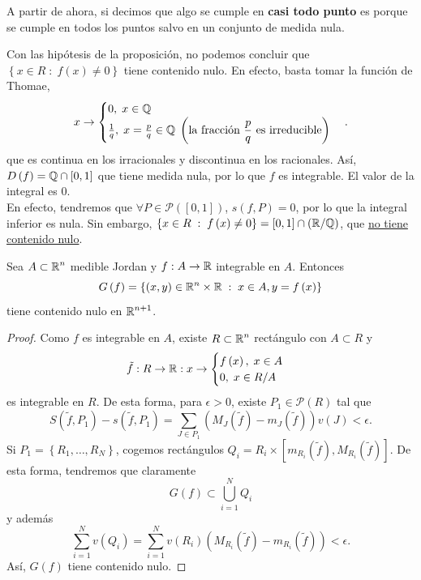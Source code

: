 \begin{notation}
A partir de ahora, si decimos que algo se cumple en \textbf{casi todo punto} es porque se cumple en todos los puntos salvo en un conjunto de medida nula.
\end{notation}
\begin{observation}
	Con las hipótesis de la proposición, no podemos concluir que $\displaystyle \left\{ x \in R \; : \; f\left(x\right) \neq 0\right\}  $ tiene contenido nulo. En efecto, basta tomar la función de Thomae,
	\[x \to 
	\begin{cases}
	0, \; x \in \mathbb{Q} \\
	\frac{1}{q}, \; x=\frac{p}{q} \in \mathbb{Q} \; \left(\text{la fracción $\displaystyle \frac{p}{q} $ es irreducible}\right)
	\end{cases}
	.\]
	que es continua en los irracionales y discontinua en los racionales. Así, $\displaystyle D\left(f\right) = \mathbb{Q} \cap \left[0,1\right]  $ que tiene medida nula, por lo que $\displaystyle f $ es integrable. El valor de la integral es 0. \\

	En efecto, tendremos que $\displaystyle \forall P \in \mathcal{P}\left(\left[0,1\right] \right) $, $\displaystyle s\left(f,P\right)= 0 $, por lo que la integral inferior es nula. 
	Sin embargo, $\displaystyle \left\{ x \in R \; : \; f\left(x\right)\neq 0\right\} = \left[0,1\right] \cap \left(\mathbb{R}/ \mathbb{Q}\right) $, que \underline{no tiene contenido nulo}.
\end{observation}
\begin{prop}
Sea $\displaystyle A \subset \mathbb{R}^{n} $ medible Jordan y $\displaystyle f :A \to \mathbb{R} $ integrable en $\displaystyle A $. Entonces
\[G\left(f\right)= \left\{ \left(x,y\right)\in \mathbb{R}^{n} \times \mathbb{R} \; : \; x \in A, y = f\left(x\right)\right\}  \]
tiene contenido nulo en $\displaystyle \mathbb{R}^{n+1} $. 
\end{prop}
\begin{proof}
Como $\displaystyle f $ es integrable en $\displaystyle A $, existe $\displaystyle R \subset \mathbb{R}^{n} $ rectángulo con $\displaystyle A \subset R $ y
\[\tilde{f} : R \to \mathbb{R} : x \to 
\begin{cases}
f\left(x\right), \; x \in A \\
0, \; x \in R/A
\end{cases}
\]
es integrable en $\displaystyle R $. De esta forma, para $\displaystyle \epsilon > 0 $, existe $\displaystyle P_{1} \in \mathcal{P}\left(R\right) $ tal que 
\[S\left(\tilde{f}, P_{1}\right)-s\left(\tilde{f},P_{1}\right)=\sum^{}_{J \in P_{1}}\left(M_{J}\left(\tilde{f}\right)-m_{J}\left(\tilde{f}\right)\right)v\left(J\right) < \epsilon  .\]
Si $\displaystyle P_{1}= \left\{ R_{1}, \ldots, R_{N}\right\}  $, cogemos rectángulos $\displaystyle Q_{i}= R_{i} \times \left[m_{R_{i}}\left(\tilde{f}\right), M_{R_{i}}\left(\tilde{f}\right)\right] $. De esta forma, tendremos que claramente
\[G\left(f\right)\subset \bigcup_{i=1}^{N}Q_{i} \]
y además
\[\sum^{N}_{i=1}v\left(Q_{i}\right)=\sum^{N}_{i=1}v\left(R_{i}\right)\left(M_{R_{i}}\left(\tilde{f}\right)-m_{R_{i}}\left(\tilde{f}\right)\right) < \epsilon  .\]
Así, $\displaystyle G\left(f\right) $ tiene contenido nulo.
\end{proof}
